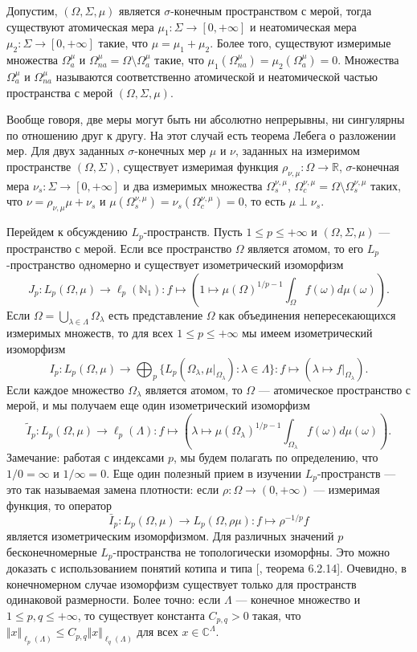 Допустим, $(\Omega,\Sigma,\mu)$ является $\sigma$-конечным пространством с мерой, тогда существуют атомическая мера $\mu_1:\Sigma\to[0,+\infty]$ и неатомическая мера $\mu_2:\Sigma\to[0,+\infty]$ такие, что $\mu=\mu_1+\mu_2$. Более того, существуют измеримые множества $\Omega_a^{\mu}$ и $\Omega_{na}^{\mu}=\Omega\setminus \Omega_a^{\mu}$ такие, что $\mu_1(\Omega_{na}^{\mu})=\mu_2(\Omega_a^{\mu})=0$. Множества $\Omega_a^{\mu}$ и $\Omega_{na}^{\mu}$ называются соответственно атомической и неатомической частью пространства с мерой $(\Omega,\Sigma,\mu)$.

Вообще говоря, две меры могут быть ни абсолютно непрерывны, ни сингулярны по отношению друг к другу. На этот случай есть теорема Лебега о разложении мер. Для двух заданных $\sigma$-конечных мер $\mu$ и $\nu$, заданных на измеримом пространстве $(\Omega,\Sigma)$, существует измеримая функция $\rho_{\nu,\mu}:\Omega\to\mathbb{R}$, $\sigma$-конечная мера $\nu_s:\Sigma\to[0,+\infty]$ и два измеримых множества $\Omega_s^{\nu,\mu}$, $\Omega_c^{\nu,\mu}=\Omega\setminus\Omega_s^{\nu,\mu}$ таких, что
$\nu=\rho_{\nu,\mu}\mu+\nu_s$ и $\mu(\Omega_s^{\nu,\mu})=\nu_s(\Omega_c^{\nu,\mu})=0$, то есть $\mu\perp\nu_s$.

Перейдем к обсуждению $L_p$-пространств. Пусть $1\leq p\leq+\infty$ и $(\Omega,\Sigma,\mu)$ --- пространство с мерой. Если все пространство $\Omega$ является атомом, то его $L_p$-пространство одномерно и существует изометрический изоморфизм
$$
J_p:L_p(\Omega,\mu)\to \ell_p(\mathbb{N}_1):f\mapsto\left(1\mapsto \mu(\Omega)^{1/p-1}\int_{\Omega} f(\omega)d\mu(\omega)\right).
$$
Если $\Omega=\bigcup_{\lambda\in\Lambda}\Omega_\lambda$ есть представление $\Omega$ как объединения непересекающихся измеримых множеств, то для всех $1\leq p\leq+\infty$ мы имеем изометрический изоморфизм
$$
I_p:L_p(\Omega,\mu)\to \bigoplus\nolimits_p\{ L_p(\Omega_\lambda,\mu|_{\Omega_\lambda}):\lambda\in\Lambda\}: f\mapsto (\lambda\mapsto f|_{\Omega_\lambda}).
$$
Если каждое множество $\Omega_\lambda$ является атомом, то $\Omega$ --- атомическое пространство с мерой, и мы получаем еще один изометрический изоморфизм
$$
\widetilde{I}_p:L_p(\Omega,\mu)\to \ell_p(\Lambda):f\mapsto\left (\lambda\mapsto \mu(\Omega_\lambda)^{1/p-1}\int_{\Omega_\lambda} f(\omega)d\mu(\omega)\right).
$$
Замечание: работая с индексами $p$, мы будем полагать по определению, что $1/0=\infty$ и $1/\infty=0$. Еще один полезный прием в изучении $L_p$-пространств --- это так называемая замена плотности: если $\rho:\Omega\to(0,+\infty)$ --- измеримая функция, то оператор
$$
\bar{I}_p:L_p(\Omega,\mu)\to L_p(\Omega,\rho\mu): f\mapsto\rho^{-1/p} f
$$
является изометрическим изоморфизмом. Для различных значений $p$ бесконечномерные $L_p$-пространства не топологически изоморфны. Это можно доказать с использованием понятий котипа и типа [\cite{KalAlbTopicsBanSpTh}, теорема 6.2.14]. Очевидно, в конечномерном случае изоморфизм существует только для пространств одинаковой размерности. Более точно: если $\Lambda$ --- конечное множество и $1\leq p,q\leq +\infty$, то существует константа $C_{p,q}>0$ такая, что $\Vert x\Vert_{\ell_p(\Lambda)}\leq C_{p,q}\Vert x\Vert_{\ell_q(\Lambda)}$ для всех $x\in\mathbb{C}^\Lambda$.


